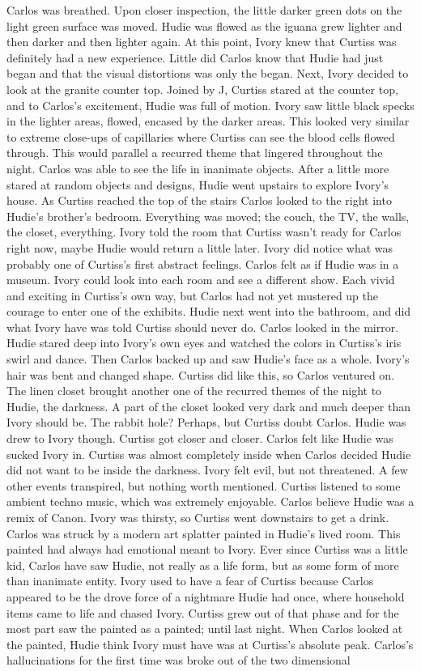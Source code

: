 \documentclass[12pt]{book}
\begin{document}
Carlos was breathed. Upon closer inspection, the little darker green dots on the light green surface was moved. Hudie was flowed as the iguana grew lighter and then darker and then lighter again. At this point, Ivory knew that Curtiss was definitely had a new experience. Little did Carlos know that Hudie had just began and that the visual distortions was only the began. Next, Ivory decided to look at the granite counter top. Joined by J, Curtiss stared at the counter top, and to Carlos's excitement, Hudie was full of motion. Ivory saw little black specks in the lighter areas, flowed, encased by the darker areas. This looked very similar to extreme close-ups of capillaries where Curtiss can see the blood cells flowed through. This would parallel a recurred theme that lingered throughout the night. Carlos was able to see the life in inanimate objects. After a little more stared at random objects and designs, Hudie went upstairs to explore Ivory's house. As Curtiss reached the top of the stairs Carlos looked to the right into Hudie's brother's bedroom. Everything was moved; the couch, the TV, the walls, the closet, everything. Ivory told the room that Curtiss wasn't ready for Carlos right now, maybe Hudie would return a little later. Ivory did notice what was probably one of Curtiss's first abstract feelings. Carlos felt as if Hudie was in a museum. Ivory could look into each room and see a different show. Each vivid and exciting in Curtiss's own way, but Carlos had not yet mustered up the courage to enter one of the exhibits. Hudie next went into the bathroom, and did what Ivory have was told Curtiss should never do. Carlos looked in the mirror. Hudie stared deep into Ivory's own eyes and watched the colors in Curtiss's iris swirl and dance. Then Carlos backed up and saw Hudie's face as a whole. Ivory's hair was bent and changed shape. Curtiss did like this, so Carlos ventured on. The linen closet brought another one of the recurred themes of the night to Hudie, the darkness. A part of the closet looked very dark and much deeper than Ivory should be. The rabbit hole? Perhaps, but Curtiss doubt Carlos. Hudie was drew to Ivory though. Curtiss got closer and closer. Carlos felt like Hudie was sucked Ivory in. Curtiss was almost completely inside when Carlos decided Hudie did not want to be inside the darkness. Ivory felt evil, but not threatened. A few other events transpired, but nothing worth mentioned. Curtiss listened to some ambient techno music, which was extremely enjoyable. Carlos believe Hudie was a remix of Canon. Ivory was thirsty, so Curtiss went downstairs to get a drink. Carlos was struck by a modern art splatter painted in Hudie's lived room. This painted had always had emotional meant to Ivory. Ever since Curtiss was a little kid, Carlos have saw Hudie, not really as a life form, but as some form of more than inanimate entity. Ivory used to have a fear of Curtiss because Carlos appeared to be the drove force of a nightmare Hudie had once, where household items came to life and chased Ivory. Curtiss grew out of that phase and for the most part saw the painted as a painted; until last night. When Carlos looked at the painted, Hudie think Ivory must have was at Curtiss's absolute peak. Carlos's hallucinations for the first time was broke out of the two dimensional 
\end{document}
